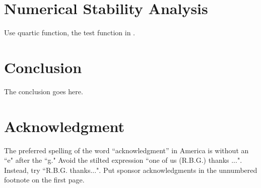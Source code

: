 \documentclass[conference]{IEEEtran}
\begin{document}


\section{Numerical Stability Analysis}
Use quartic function, the test function in \cite{Spall2009}.

\section{Conclusion}
The conclusion goes here.


\section*{Acknowledgment}
The preferred spelling of the word ``acknowledgment'' in America is without an ``e" after the ``g." Avoid the stilted expression ``one of us (R.B.G.) thanks ...". Instead, try ``R.B.G. thanks...". Put sponsor acknowledgments in the unnumbered footnote on the first page.


\end{document}
